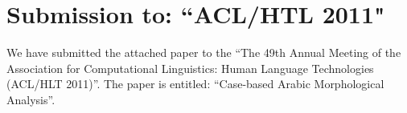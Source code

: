 \documentclass[12pt]{article}
\begin{document}
\section{Submission to: ``ACL/HTL 2011"}
\label{s:paper}

We have submitted the attached paper to the “The 49th Annual Meeting of the Association for Computational Linguistics: Human Language Technologies (ACL/HLT 2011)”. The paper is entitled: “Case-based Arabic Morphological Analysis”.

%
%

%
{\small
  
}
\end{document}
